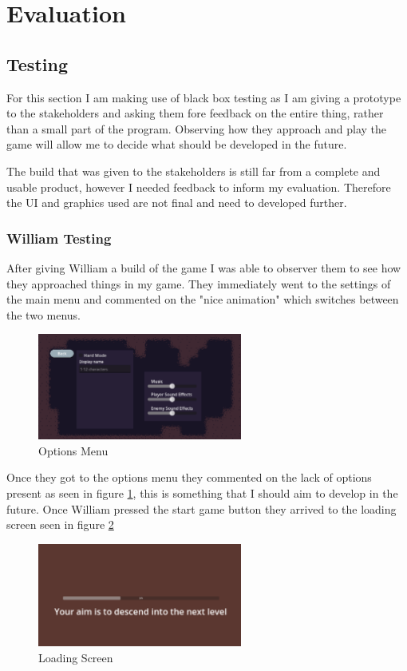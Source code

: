 \documentclass{article}
\newcommand{\parBr}{\vspace{5mm}}%
\begin{document}
\section{Evaluation}
\subsection{Testing}
For this section I am making use of black box testing as I am giving a prototype to the stakeholders and asking them fore feedback on the entire thing, rather than a small part of the program. Observing how they approach and play the game will allow me to decide what should be developed in the future.

\parBr

The build that was given to the stakeholders is still far from a complete and usable product, however I needed feedback to inform my evaluation. Therefore the UI and graphics used are not final and need to developed further.

\subsubsection{William Testing}
After giving William a build of the game I was able to observer them to see how they approached things in my game. They immediately went to the settings of the main menu and commented on the "nice animation" which switches between the two menus.

\begin{figure}[H]
\centering
\includegraphics[width=0.6\textwidth]{options}
\caption{Options Menu}
\label{options_men}
\end{figure}

Once they got to the options menu they commented on the lack of options present as seen in figure \ref{options_men}, this is something that I should aim to develop in the future. Once William pressed the start game button they arrived to the loading screen seen in figure \ref{load_men}

\begin{figure}[H]
\centering
\includegraphics[width=0.6\textwidth]{load menu}
\caption{Loading Screen}
\label{load_men}
\end{figure}
\end{document}
